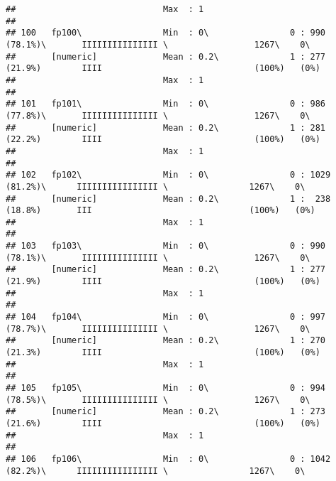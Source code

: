 \documentclass[]{article}
\begin{document}
\begin{verbatim}
##                             Max  : 1                                                                                            
## 
## 100   fp100\                Min  : 0\                0 : 990 (78.1%)\       IIIIIIIIIIIIIII \                 1267\    0\       
##       [numeric]             Mean : 0.2\              1 : 277 (21.9%)        IIII                              (100%)   (0%)     
##                             Max  : 1                                                                                            
## 
## 101   fp101\                Min  : 0\                0 : 986 (77.8%)\       IIIIIIIIIIIIIII \                 1267\    0\       
##       [numeric]             Mean : 0.2\              1 : 281 (22.2%)        IIII                              (100%)   (0%)     
##                             Max  : 1                                                                                            
## 
## 102   fp102\                Min  : 0\                0 : 1029 (81.2%)\      IIIIIIIIIIIIIIII \                1267\    0\       
##       [numeric]             Mean : 0.2\              1 :  238 (18.8%)       III                               (100%)   (0%)     
##                             Max  : 1                                                                                            
## 
## 103   fp103\                Min  : 0\                0 : 990 (78.1%)\       IIIIIIIIIIIIIII \                 1267\    0\       
##       [numeric]             Mean : 0.2\              1 : 277 (21.9%)        IIII                              (100%)   (0%)     
##                             Max  : 1                                                                                            
## 
## 104   fp104\                Min  : 0\                0 : 997 (78.7%)\       IIIIIIIIIIIIIII \                 1267\    0\       
##       [numeric]             Mean : 0.2\              1 : 270 (21.3%)        IIII                              (100%)   (0%)     
##                             Max  : 1                                                                                            
## 
## 105   fp105\                Min  : 0\                0 : 994 (78.5%)\       IIIIIIIIIIIIIII \                 1267\    0\       
##       [numeric]             Mean : 0.2\              1 : 273 (21.6%)        IIII                              (100%)   (0%)     
##                             Max  : 1                                                                                            
## 
## 106   fp106\                Min  : 0\                0 : 1042 (82.2%)\      IIIIIIIIIIIIIIII \                1267\    0\       

\end{verbatim}
\end{document}
